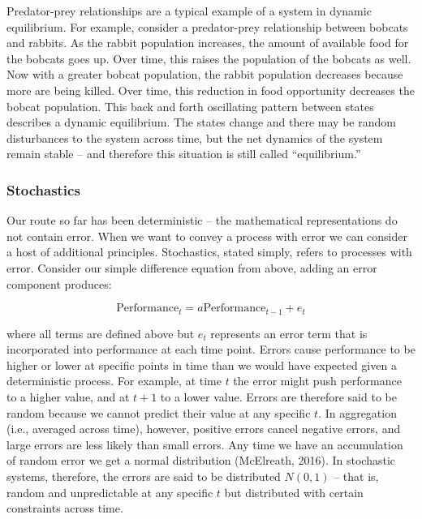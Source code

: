 \documentclass[english,,man]{apa6}
\theoremstyle{definition}
\theoremstyle{definition}
\theoremstyle{definition}
\theoremstyle{remark}
\begin{document}
Predator-prey relationships are a typical example of a system in dynamic
equilibrium. For example, consider a predator-prey relationship between
bobcats and rabbits. As the rabbit population increases, the amount of
available food for the bobcats goes up. Over time, this raises the
population of the bobcats as well. Now with a greater bobcat population,
the rabbit population decreases because more are being killed. Over
time, this reduction in food opportunity decreases the bobcat
population. This back and forth oscillating pattern between states
describes a dynamic equilibrium. The states change and there may be
random disturbances to the system across time, but the net dynamics of
the system remain stable -- and therefore this situation is still called
\enquote{equilibrium.}

\hypertarget{stochastics}{%
\subsubsection{Stochastics}\label{stochastics}}

Our route so far has been deterministic -- the mathematical
representations do not contain error. When we want to convey a process
with error we can consider a host of additional principles. Stochastics,
stated simply, refers to processes with error. Consider our simple
difference equation from above, adding an error component produces:

\begin{equation}
\label{diffE}
\textrm{Performance}_{t} = a \textrm{Performance}_{t-1} + e_{t}
\end{equation}

\noindent where all terms are defined above but \(e_{t}\) represents an
error term that is incorporated into performance at each time point.
Errors cause performance to be higher or lower at specific points in
time than we would have expected given a deterministic process. For
example, at time \(t\) the error might push performance to a higher
value, and at \(t+1\) to a lower value. Errors are therefore said to be
random because we cannot predict their value at any specific \(t\). In
aggregation (i.e., averaged across time), however, positive errors
cancel negative errors, and large errors are less likely than small
errors. Any time we have an accumulation of random error we get a normal
distribution (McElreath, 2016). In stochastic systems, therefore, the
errors are said to be distributed \(N(0, 1)\) -- that is, random and
unpredictable at any specific \(t\) but distributed with certain
constraints across time.
\end{document}
